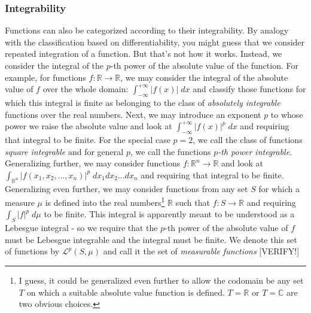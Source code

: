 

\subsubsection{Integrability} Functions can also be categorized according to their integrability. By analogy with the classification based on differentiability, you might guess that we consider repeated integration of a function. But that's not how it works. Instead, we consider the integral of the $p$-th power of the absolute value of the function. For example, for functions $f: \mathbb{R} \rightarrow \mathbb{R}$, we may consider the integral of the absolute value of $f$ over the whole domain: $\int_{-\infty}^{+\infty} |f(x)| \; dx$ and classify those functions for which this integral is finite as belonging to the class of \emph{absolutely integrable} functions over the real numbers. Next, we may introduce an exponent $p$ to whose power we raise the absolute value and look at $\int_{-\infty}^{+\infty} |f(x)|^p \; dx$ and requiring that integral to be finite. For the special case $p=2$, we call the class of functions \emph{square integrable} and for general $p$, we call the functions \emph{$p$-th power integrable}. Generalizing further, we may consider functions $f: \mathbb{R}^n \rightarrow \mathbb{R}$ and look at $\int_{\mathbb{R}^n} |f(x_1, x_2,\ldots,x_n)|^p \; dx_1 dx_2 \ldots dx_n$ and requiring that integral to be finite. Generalizing even further, we may consider functions from any set $S$ for which a measure $\mu$ is defined into the real numbers\footnote{I guess, it could be generalized even further to allow the codomain be any set $T$ on which a suitable absolute value function is defined. $T =\mathbb{R}$ or $T = \mathbb{C}$ are two obvious choices.} $\mathbb{R}$ such that $f: S \rightarrow \mathbb{R}$ and requiring $\int_S |f|^p \; d \mu $ to be finite. This integral is apparently meant to be understood as a Lebesgue integral - so we require that the $p$-th power of the absolute value of $f$ must be Lebesgue integrable and the integral must be finite. We denote this set of functions by $\mathcal{L}^p(S,\mu)$ and call it the set of \emph{measurable functions} [VERIFY!]





